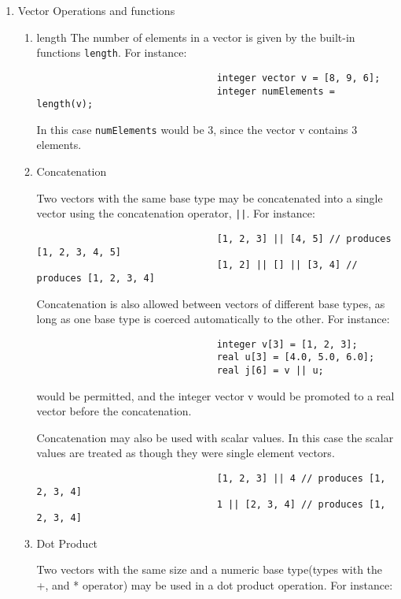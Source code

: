 \documentclass[../../gazprea.tex]{subfiles}
\begin{document}
			\begin{enumerate}
				\item Vector Operations and functions
					\begin{enumerate}
						\item length
							The number of elements in a vector is given by the built-in functions \texttt{length}. For
							instance:

							\begin{lstlisting}
								integer vector v = [8, 9, 6];
								integer numElements = length(v);
							\end{lstlisting}

							In this case \texttt{numElements} would be 3, since the vector v contains 3 elements.

						\item Concatenation

							Two vectors with the same base type may be concatenated into a single vector using the
							concatenation operator, \texttt{||}. For instance:

							\begin{lstlisting}
								[1, 2, 3] || [4, 5] // produces [1, 2, 3, 4, 5]
								[1, 2] || [] || [3, 4] // produces [1, 2, 3, 4]
							\end{lstlisting}

							Concatenation is also allowed between vectors of different base types, as long as one base
							type is coerced automatically to the other. For instance:

							\begin{lstlisting}
								integer v[3] = [1, 2, 3];
								real u[3] = [4.0, 5.0, 6.0];
								real j[6] = v || u;
							\end{lstlisting}

							would be permitted, and the integer vector v would be promoted to a real vector before the
							concatenation.

							Concatenation may also be used with scalar values. In this case the scalar values are
							treated as though they were single element vectors.

							\begin{lstlisting}
								[1, 2, 3] || 4 // produces [1, 2, 3, 4]
								1 || [2, 3, 4] // produces [1, 2, 3, 4]
							\end{lstlisting}

						\item Dot Product

							Two vectors with the same size and a numeric base type(types with the +, and * operator)
							may be used in a dot product operation. For instance:


\end{enumerate}
\end{enumerate}
\end{document}
